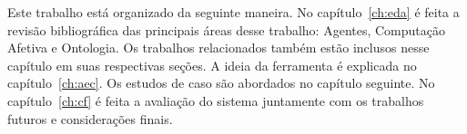 Este trabalho está organizado da seguinte maneira. No capítulo~\ref{ch:eda}
é feita a revisão bibliográfica das principais áreas desse trabalho:
Agentes, Computação Afetiva e Ontologia. Os trabalhos relacionados também
estão inclusos nesse capítulo em suas respectivas seções. A ideia da
ferramenta é explicada no capítulo~\ref{ch:aec}. Os estudos de caso são abordados no
capítulo seguinte. No capítulo~\ref{ch:cf} é feita a avaliação do sistema
juntamente com os trabalhos futuros e considerações finais.
